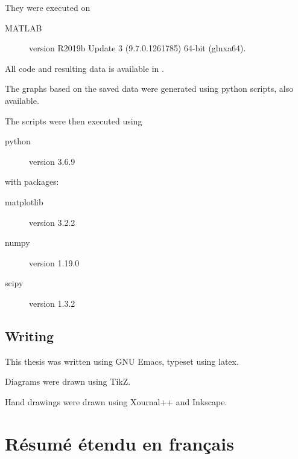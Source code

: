 \documentclass[../main.tex]{subfiles}
\begin{document}
They were executed on
\begin{description}
\item[MATLAB] version R2019b Update 3 (9.7.0.1261785) 64-bit (glnxa64).
\end{description}

All code and resulting data is available in .

The graphs based on the saved data were generated using python scripts, also available.

The scripts were then executed using
\begin{description}
\item[python] version 3.6.9
\end{description}
with packages:
\begin{description}
    \item[matplotlib] version 3.2.2
    \item[numpy] version 1.19.0
    \item[scipy] version 1.3.2
\end{description}
\section{Writing}
This thesis was written using GNU Emacs, typeset using \gls{latex}.

Diagrams were drawn using \gls{TikZ}.

Hand drawings were drawn using Xournal++ and Inkscape.

\chapter{Résumé étendu en français}
\end{document}
